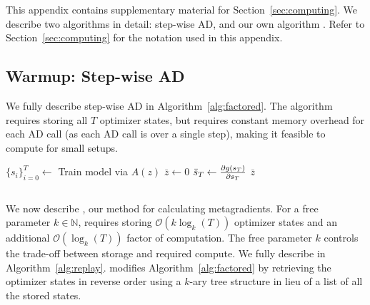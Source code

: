 This appendix contains supplementary material for Section~\ref{sec:computing}.
We describe two algorithms in detail: step-wise AD, and our own algorithm
\replay{}. Refer to Section~\ref{sec:computing} for the notation used in this
appendix.

\subsection{Warmup: Step-wise AD}
\label{sec:ad}
We fully describe step-wise AD in Algorithm~\ref{alg:factored}. The algorithm
requires storing all $T$ optimizer states, but requires constant memory overhead
for each AD call (as each AD call is over a single step), making it feasible to
compute for small setups.

\begin{algorithm}
  \DontPrintSemicolon
  \hspace{0pt} 
  $\{s_i\}_{i=0}^T \gets$ Train model via $A(z)$ \;
  \;
  \hspace{0pt} 
  $\bar{z} \gets 0$ \;
  $\bar{s}_T \gets \smash{\frac{\partial g(s_T)}{\partial s_T}}$ \qquad {} %
  \;
  \hspace{0pt} 
  \;
  \Return $\bar{z}$ \;
  \caption{metagradients in $\mathcal{O}(T)$ space.}
  \label{alg:factored}
\end{algorithm}

\subsection{\replay{}}
\label{app:replay}
We now describe \replay{}, our method for calculating metagradients. For a free
parameter $k \in \mathbb{N}$, \replay{} requires storing $\mathcal{O}(k\log_k(T))$ optimizer
states and an additional $\mathcal{O}(\log_k(T))$ factor of computation. The
free parameter $k$ controls the trade-off between storage and required compute.
We fully describe \replay{} in Algorithm~\ref{alg:replay}. \replay{} modifies
Algorithm~\ref{alg:factored} by retrieving the optimizer states in reverse order
using a $k$-ary tree structure in lieu of a list of all the stored states.

